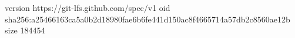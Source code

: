 version https://git-lfs.github.com/spec/v1
oid sha256:a25466163ca5a0b2d18980fae6b6fe441d150ac8f4665714a57db2c8560ae12b
size 184454
